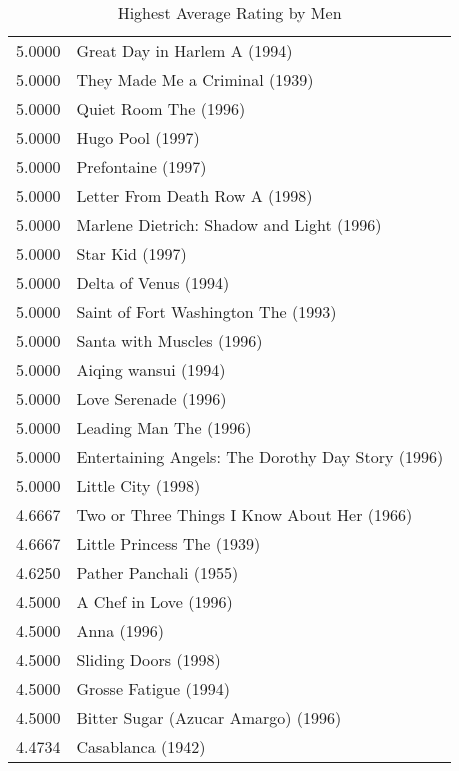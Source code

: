 \begin{flushleft}

\begin{table}[h]
\centering
\begin{tabular}{ll}
5.0000 & Great Day in Harlem A (1994)                            \\
5.0000 & They Made Me a Criminal (1939)                          \\
5.0000 & Quiet Room The (1996)                                   \\
5.0000 & Hugo Pool (1997)                                        \\
5.0000 & Prefontaine (1997)                                      \\
5.0000 & Letter From Death Row A (1998)                          \\
5.0000 & Marlene Dietrich: Shadow and Light (1996)               \\
5.0000 & Star Kid (1997)                                         \\
5.0000 & Delta of Venus (1994)                                   \\
5.0000 & Saint of Fort Washington The (1993)                     \\
5.0000 & Santa with Muscles (1996)                               \\
5.0000 & Aiqing wansui (1994)                                    \\
5.0000 & Love Serenade (1996)                                    \\
5.0000 & Leading Man The (1996)                                  \\
5.0000 & Entertaining Angels: The Dorothy Day Story (1996)       \\
5.0000 & Little City (1998)                                      \\ \hline
4.6667 & Two or Three Things I Know About Her (1966)             \\
4.6667 & Little Princess The (1939)                              \\ \hline
4.6250 & Pather Panchali (1955)                                  \\ \hline
4.5000 & A Chef in Love (1996)                                   \\  
4.5000 & Anna (1996)                                             \\
4.5000 & Sliding Doors (1998)                                    \\
4.5000 & Grosse Fatigue (1994)                                   \\
4.5000 & Bitter Sugar (Azucar Amargo) (1996)                     \\ \hline
4.4734 & Casablanca (1942)                                       \\   

\end{tabular}
\caption{Highest Average Rating by Men}
\end{table}




\end{flushleft}




